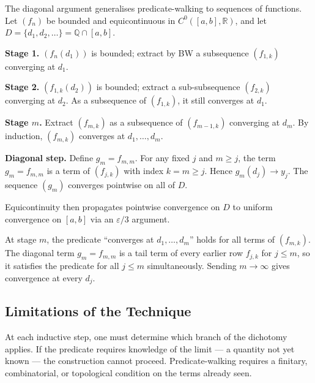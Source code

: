 \begin{remark}
\label{rem:arzela-ascoli}
The diagonal argument generalises predicate-walking to sequences of
functions. Let $(f_n)$ be bounded and equicontinuous in
$C^0([a,b],\mathbb{R})$, and let $D=\{d_1,d_2,\ldots\}=\mathbb{Q}\cap[a,b]$.

\medskip
\noindent\textbf{Stage 1.} $(f_n(d_1))$ is bounded; extract by BW a
subsequence $(f_{1,k})$ converging at $d_1$.

\noindent\textbf{Stage 2.} $(f_{1,k}(d_2))$ is bounded; extract a
sub-subsequence $(f_{2,k})$ converging at $d_2$. As a subsequence of
$(f_{1,k})$, it still converges at $d_1$.

\noindent\textbf{Stage $m$.} Extract $(f_{m,k})$ as a subsequence of
$(f_{m-1,k})$ converging at $d_m$. By induction, $(f_{m,k})$ converges
at $d_1,\ldots,d_m$.

\noindent\textbf{Diagonal step.} Define $g_m=f_{m,m}$. For any fixed $j$
and $m\geq j$, the term $g_m=f_{m,m}$ is a term of $(f_{j,k})$ with
index $k=m\geq j$. Hence $g_m(d_j)\to y_j$. The sequence $(g_m)$
converges pointwise on all of $D$.

\medskip
Equicontinuity then propagates pointwise convergence on $D$ to uniform
convergence on $[a,b]$ via an $\varepsilon/3$ argument.
\end{remark}

\begin{remark}
At stage $m$, the predicate ``converges at $d_1,\ldots,d_m$'' holds for
all terms of $(f_{m,k})$. The diagonal term $g_m=f_{m,m}$ is a tail term
of every earlier row $f_{j,k}$ for $j\leq m$, so it satisfies the
predicate for all $j\leq m$ simultaneously. Sending $m\to\infty$ gives
convergence at every $d_j$.
\end{remark}



\subsection*{Limitations of the Technique}
\label{subsec:predicate-limitations}

\begin{remark}
At each inductive step, one must determine which branch of the dichotomy
applies. If the predicate requires knowledge of the limit — a quantity not
yet known — the construction cannot proceed. Predicate-walking requires a
finitary, combinatorial, or topological condition on the terms already seen.
\end{remark}

